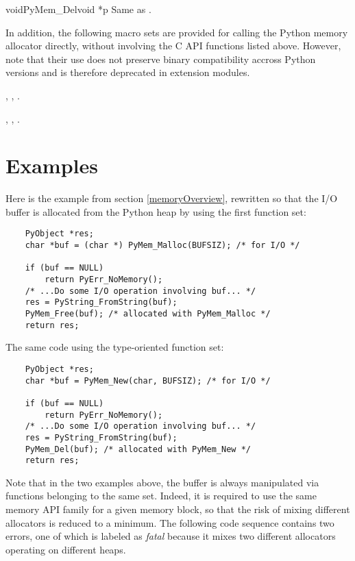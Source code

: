 \documentclass{manual}
\begin{document}
\begin{cfuncdesc}{void}{PyMem_Del}{void *p}
Same as .
\end{cfuncdesc}

In addition, the following macro sets are provided for calling the
Python memory allocator directly, without involving the C API functions
listed above. However, note that their use does not preserve binary
compatibility accross Python versions and is therefore deprecated in
extension modules.

, , .

, , .


\section{Examples \label{memoryExamples}}

Here is the example from section \ref{memoryOverview}, rewritten so
that the I/O buffer is allocated from the Python heap by using the
first function set:

\begin{verbatim}
    PyObject *res;
    char *buf = (char *) PyMem_Malloc(BUFSIZ); /* for I/O */

    if (buf == NULL)
        return PyErr_NoMemory();
    /* ...Do some I/O operation involving buf... */
    res = PyString_FromString(buf);
    PyMem_Free(buf); /* allocated with PyMem_Malloc */
    return res;
\end{verbatim}

The same code using the type-oriented function set:

\begin{verbatim}
    PyObject *res;
    char *buf = PyMem_New(char, BUFSIZ); /* for I/O */

    if (buf == NULL)
        return PyErr_NoMemory();
    /* ...Do some I/O operation involving buf... */
    res = PyString_FromString(buf);
    PyMem_Del(buf); /* allocated with PyMem_New */
    return res;
\end{verbatim}

Note that in the two examples above, the buffer is always
manipulated via functions belonging to the same set. Indeed, it
is required to use the same memory API family for a given
memory block, so that the risk of mixing different allocators is
reduced to a minimum. The following code sequence contains two errors,
one of which is labeled as \emph{fatal} because it mixes two different
allocators operating on different heaps.
\end{document}
